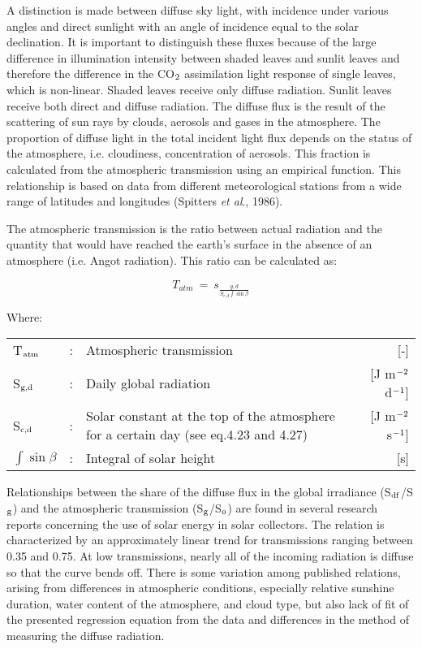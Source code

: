 A distinction is made between diffuse sky light, with incidence under various angles and
direct sunlight with an angle of incidence equal to the solar declination. It is important to distin\-guish these fluxes because of the large difference in illumination intensity between shaded leaves and sunlit leaves and therefore the difference in the CO$_{{\rm 2}}$ assimila\-tion light response of single leaves, which is non-linear. Shaded leaves receive only diffuse radiation. Sunlit leaves receive both direct and diffuse radiation. The diffuse flux is the result of the scattering of sun rays by clouds, aerosols and gases in the atmo\-sphere. The propor\-tion of diffuse light in the total incident light flux depends on the status of the atmosphere, i.e. cloudi\-ness, concentra\-tion of aerosols. This fraction is calculated from the atmospheric transmis\-sion using an empirical function. This relationship is based on data from different meteorologi\-cal stations from a wide range of latitudes and longitudes (Spitters {\it et al}., 1986). 

The atmospheric transmission is the ratio between actual radiation and the quantity that
would have reached the earth's surface in the absence of an atmosphere (i.e. Angot
radiation). This ratio can be calculated as:

\begin{equation}
T _{atm} ~=~ s _{\frac{g,d}{S _{c,d} \int \sin \beta }}
\end{equation}

Where:\\[5pt]
\begin{tabularx}{\textwidth}{llXr}
T$_{{\rm atm}}$ &:& Atmospheric transmission  & [-]\\
S$_{{\rm g,d}}$ &:& Daily global radiation  & [J m$^{{\rm -2}}$ d$^{{\rm -1}}$]\\
S$_{{\rm c,d}}$ &:& Solar constant at the top of the atmosphere for a certain day (see eq.4.23 and 4.27)  & [J m$^{{\rm -2}}$ s$^{{\rm -1}}$]\\
$\int \sin \beta$  &:& Integral of solar height   & [s]\\
\end{tabularx}

Relationships between the share of the diffuse flux in the global irradiance (S$_{{\rm df}}$/S$_{{\rm g}}$) and the atmospheric transmission (S$_{{\rm g}}$/S$_{{\rm o}}$) are found in several research reports concerning the use
of solar energy in solar collectors. The relation is characterized by an approximately
linear trend for transmissions ranging between 0.35 and 0.75. At low transmissions,
nearly all of the incoming radiation is diffuse so that the curve bends off.
There is some variation among published relations, arising from differences in atmos\-pheric conditions, especially relative sunshine duration, water content of the atmosphere,
and cloud type, but also lack of fit of the presented regression equation from the data and
differences in the method of measuring the diffuse radiation.

